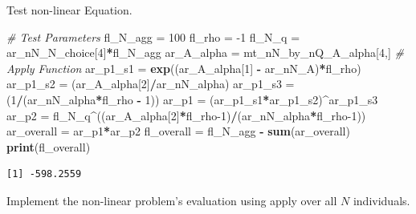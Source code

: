 \documentclass[
]{book}
\newenvironment{Shaded}{\begin{snugshade}}{\end{snugshade}}
\newcommand{\CommentTok}[1]{\textcolor[rgb]{0.56,0.35,0.01}{\textit{#1}}}
\newcommand{\DecValTok}[1]{\textcolor[rgb]{0.00,0.00,0.81}{#1}}
\newcommand{\KeywordTok}[1]{\textcolor[rgb]{0.13,0.29,0.53}{\textbf{#1}}}
\newcommand{\NormalTok}[1]{#1}
\newcommand{\OperatorTok}[1]{\textcolor[rgb]{0.81,0.36,0.00}{\textbf{#1}}}
\newcommand{\StringTok}[1]{\textcolor[rgb]{0.31,0.60,0.02}{#1}}
\begin{document}
Test non-linear Equation.

\begin{Shaded}
\begin{Highlighting}[]
\CommentTok{# Test Parameters}
\NormalTok{fl_N_agg =}\StringTok{ }\DecValTok{100}
\NormalTok{fl_rho =}\StringTok{ }\DecValTok{-1}
\NormalTok{fl_N_q =}\StringTok{ }\NormalTok{ar_nN_N_choice[}\DecValTok{4}\NormalTok{]}\OperatorTok{*}\NormalTok{fl_N_agg}
\NormalTok{ar_A_alpha =}\StringTok{ }\NormalTok{mt_nN_by_nQ_A_alpha[}\DecValTok{4}\NormalTok{,]}
\CommentTok{# Apply Function}
\NormalTok{ar_p1_s1 =}\StringTok{ }\KeywordTok{exp}\NormalTok{((ar_A_alpha[}\DecValTok{1}\NormalTok{] }\OperatorTok{-}\StringTok{ }\NormalTok{ar_nN_A)}\OperatorTok{*}\NormalTok{fl_rho)}
\NormalTok{ar_p1_s2 =}\StringTok{ }\NormalTok{(ar_A_alpha[}\DecValTok{2}\NormalTok{]}\OperatorTok{/}\NormalTok{ar_nN_alpha)}
\NormalTok{ar_p1_s3 =}\StringTok{ }\NormalTok{(}\DecValTok{1}\OperatorTok{/}\NormalTok{(ar_nN_alpha}\OperatorTok{*}\NormalTok{fl_rho }\OperatorTok{-}\StringTok{ }\DecValTok{1}\NormalTok{))}
\NormalTok{ar_p1 =}\StringTok{ }\NormalTok{(ar_p1_s1}\OperatorTok{*}\NormalTok{ar_p1_s2)}\OperatorTok{^}\NormalTok{ar_p1_s3}
\NormalTok{ar_p2 =}\StringTok{ }\NormalTok{fl_N_q}\OperatorTok{^}\NormalTok{((ar_A_alpha[}\DecValTok{2}\NormalTok{]}\OperatorTok{*}\NormalTok{fl_rho}\DecValTok{-1}\NormalTok{)}\OperatorTok{/}\NormalTok{(ar_nN_alpha}\OperatorTok{*}\NormalTok{fl_rho}\DecValTok{-1}\NormalTok{))}
\NormalTok{ar_overall =}\StringTok{ }\NormalTok{ar_p1}\OperatorTok{*}\NormalTok{ar_p2}
\NormalTok{fl_overall =}\StringTok{ }\NormalTok{fl_N_agg }\OperatorTok{-}\StringTok{ }\KeywordTok{sum}\NormalTok{(ar_overall)}
\KeywordTok{print}\NormalTok{(fl_overall)}
\end{Highlighting}
\end{Shaded}

\begin{verbatim}
[1] -598.2559
\end{verbatim}

Implement the non-linear problem's evaluation using apply over all \(N\) individuals.
\end{document}
